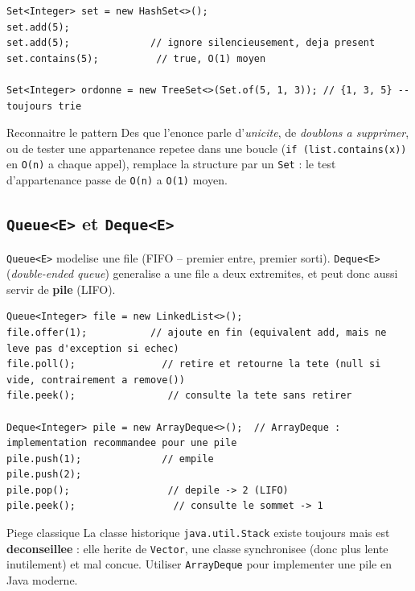 \documentclass[11pt,a4paper]{article}
\begin{document}
\begin{lstlisting}
Set<Integer> set = new HashSet<>();
set.add(5);
set.add(5);              // ignore silencieusement, deja present
set.contains(5);          // true, O(1) moyen

Set<Integer> ordonne = new TreeSet<>(Set.of(5, 1, 3)); // {1, 3, 5} -- toujours trie
\end{lstlisting}

\begin{infobox}{Reconnaitre le pattern}
Des que l'enonce parle d'\emph{unicite}, de \emph{doublons a supprimer}, ou
de tester une appartenance repetee dans une boucle (\texttt{if (list.contains(x))}
en \texttt{O(n)} a chaque appel), remplace la structure par un \texttt{Set} :
le test d'appartenance passe de \texttt{O(n)} a \texttt{O(1)} moyen.
\end{infobox}

\subsection{\texttt{Queue<E>} et \texttt{Deque<E>}}

\texttt{Queue<E>} modelise une file (FIFO -- premier entre, premier sorti).
\texttt{Deque<E>} (\emph{double-ended queue}) generalise a une file a deux
extremites, et peut donc aussi servir de \textbf{pile} (LIFO).

\begin{lstlisting}
Queue<Integer> file = new LinkedList<>();
file.offer(1);           // ajoute en fin (equivalent add, mais ne leve pas d'exception si echec)
file.poll();               // retire et retourne la tete (null si vide, contrairement a remove())
file.peek();                // consulte la tete sans retirer

Deque<Integer> pile = new ArrayDeque<>();  // ArrayDeque : implementation recommandee pour une pile
pile.push(1);              // empile
pile.push(2);
pile.pop();                 // depile -> 2 (LIFO)
pile.peek();                 // consulte le sommet -> 1
\end{lstlisting}

\begin{infobox}{Piege classique}
La classe historique \texttt{java.util.Stack} existe toujours mais est
\textbf{deconseillee} : elle herite de \texttt{Vector}, une classe
synchronisee (donc plus lente inutilement) et mal concue. Utiliser
\texttt{ArrayDeque} pour implementer une pile en Java moderne.
\end{infobox}
\end{document}
